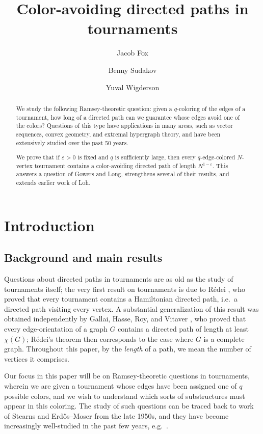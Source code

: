 \documentclass[11pt,reqno]{amsart}
\title{Color-avoiding directed paths in tournaments}
\author{Jacob Fox}
\author{Benny Sudakov}
\author{Yuval Wigderson}
\date{}
\theoremstyle{definition}
\newcommand\1{\mathbf{1}}
\begin{document}
\begin{abstract}
We study the following Ramsey-theoretic question: given a $q$-coloring of the edges of a tournament, how long of a directed path can we guarantee whose edges avoid one of the colors? 
Questions of this type have applications in many areas, such as vector sequences, convex geometry, and extremal hypergraph theory, and have been extensively studied over the past 50 years.

We prove that if $\varepsilon>0$ is fixed and $q$ is sufficiently large, then every $q$-edge-colored $N$-vertex tournament contains a color-avoiding directed path of length $N^{1-\varepsilon}$. 
This answers a question of Gowers and Long, strengthens several of their results, and extends earlier work of Loh.
\end{abstract}
\maketitle

\section{Introduction}
\subsection{Background and main results}
Questions about directed paths in tournaments are as old as the study of tournaments itself; the very first result on tournaments is due to R\'edei \cite{Redei}, who proved that every tournament contains a Hamiltonian directed path, i.e.\ a directed path visiting every vertex. 
A substantial generalization of this result was obtained independently by Gallai, Hasse, Roy, and Vitaver \cite{MR233733,MR179105,MR225683,MR145509}, who proved that every edge-orientation of a graph $G$ contains a directed path of length at least $\chi(G)$; R\'edei's theorem then corresponds to the case where $G$ is a complete graph. Throughout this paper, by the \emph{length} of a path, we mean the number of vertices it comprises.

Our focus in this paper will be on Ramsey-theoretic questions in tournaments, wherein we are given a tournament whose edges have been assigned one of $q$ possible colors, and we wish to understand which sorts of substructures must appear in this coloring. The study of such questions can be traced back to work of Stearns \cite{MR109087} and Erd\H os--Moser \cite{MR168494} from the late 1950s, and they have become increasingly well-studied in the past few years, e.g.\ \cite{MR3980089,MR4819947,MR416967,MR3567530,MR4103733}.
\end{document}
